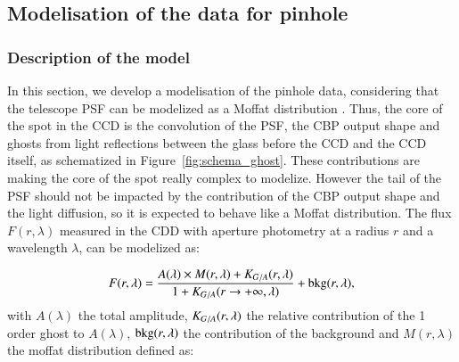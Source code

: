\subsection{Modelisation of the \SD data for \spinhole pinhole}


\subsubsection{Description of the model}

In this section, we develop a modelisation of the \spinhole pinhole data, considering that the \SD telescope PSF can be modelized as a Moffat distribution \citep{moffat}. Thus, the core of the spot in the CCD is the convolution of the PSF, the CBP output shape and ghosts from light reflections between the glass before the CCD and the CCD itself, as schematized in Figure~\ref{fig:schema_ghost}. These contributions are making the core of the spot really complex to modelize. However the tail of the PSF should not be impacted by the contribution of the CBP output shape and the light diffusion, so it is expected to behave like a Moffat distribution. The flux $F(r, \lambda)$ measured in the CDD with aperture photometry at a radius $r$ and a wavelength $\lambda$, can be modelized as: 

\begin{equation}
F(r, \lambda) = \frac{A(\lambda) \times M(r, \lambda) + K_{G/A}(r, \lambda)}{1 + K_{G/A}(r \rightarrow +\infty, \lambda)} + \mathrm{bkg}(r, \lambda),
\label{eq:moffat_model}
\end{equation}
with $A(\lambda)$ the total amplitude, $K_{G/A}(r, \lambda)$ the relative contribution of the 1 order ghost to $A(\lambda)$, $\mathrm{bkg}(r, \lambda)$ the contribution of the background and $M(r, \lambda)$ the moffat distribution defined as:

